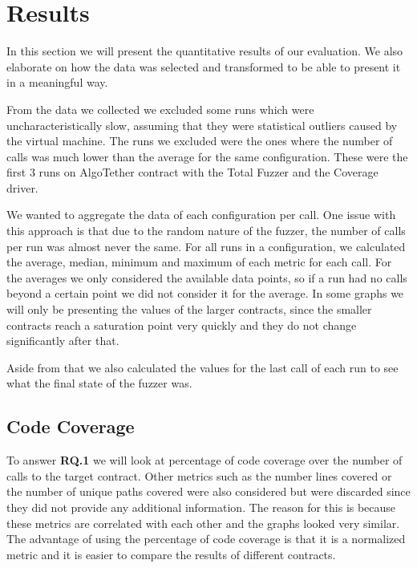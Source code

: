 \section{Results}
In this section we will present the quantitative results of our evaluation.
We also elaborate on how the data was selected and transformed to be able to present it in a meaningful way.

From the data we collected we excluded some runs which were uncharacteristically slow, assuming that they were statistical outliers caused by the virtual machine.
The runs we excluded were the ones where the number of calls was much lower than the average for the same configuration.
These were the first 3 runs on AlgoTether contract with the Total Fuzzer and the Coverage driver.

We wanted to aggregate the data of each configuration per call.
One issue with this approach is that due to the random nature of the fuzzer, the number of calls per run was almost never the same.
For all runs in a configuration, we calculated the average, median, minimum and maximum of each metric for each call.
For the averages we only considered the available data points, so if a run had no calls beyond a certain point we did not consider it for the average.
In some graphs we will only be presenting the values of the larger contracts, since the smaller contracts reach a saturation point very quickly and they do not change significantly after that.

Aside from that we also calculated the values for the last call of each run to see what the final state of the fuzzer was.

\subsection*{Code Coverage}
To answer \textbf{RQ.1} we will look at percentage of code coverage over the number of calls to the target contract.
Other metrics such as the number lines covered or the number of unique paths covered were also considered but were discarded since they did not provide any additional information.
The reason for this is because these metrics are correlated with each other and the graphs looked very similar.
The advantage of using the percentage of code coverage is that it is a normalized metric and it is easier to compare the results of different contracts.


